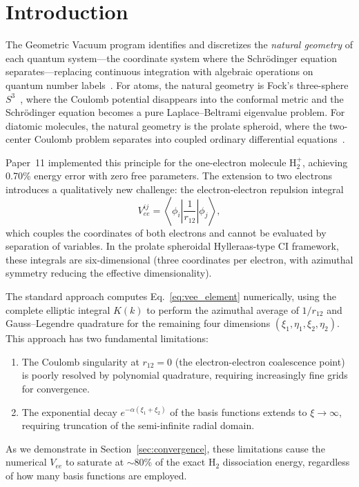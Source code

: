 \documentclass[aps,pra,twocolumn,superscriptaddress,longbibliography]{revtex4-2}
\begin{document}
\maketitle


\section{Introduction}
\label{sec:intro}

The Geometric Vacuum program identifies and discretizes the
\emph{natural geometry} of each quantum system---the coordinate
system where the Schr\"odinger equation separates---replacing
continuous integration with algebraic operations on quantum number
labels~\cite{loutey_paper0, loutey_paper1, loutey_paper7}.  For
atoms, the natural geometry is Fock's three-sphere
$S^3$~\cite{Fock1935}, where the Coulomb potential disappears into
the conformal metric and the Schr\"odinger equation becomes a pure
Laplace--Beltrami eigenvalue problem.  For diatomic molecules, the
natural geometry is the prolate spheroid, where the two-center
Coulomb problem separates into coupled ordinary differential
equations~\cite{loutey_paper11}.

Paper~11 implemented this principle for the one-electron
molecule H$_2^+$, achieving 0.70\% energy error with zero free
parameters.  The extension to two electrons introduces a
qualitatively new challenge: the electron-electron repulsion
integral
\begin{equation}
  V_{ee}^{ij} = \left\langle\phi_i\left|\frac{1}{r_{12}}\right|\phi_j\right\rangle,
  \label{eq:vee_element}
\end{equation}
which couples the coordinates of both electrons and cannot be
evaluated by separation of variables.  In the prolate spheroidal
Hylleraas-type CI framework, these integrals are six-dimensional
(three coordinates per electron, with azimuthal symmetry reducing
the effective dimensionality).

The standard approach computes Eq.~\eqref{eq:vee_element}
numerically, using the complete elliptic integral $K(k)$ to perform
the azimuthal average of $1/r_{12}$ and Gauss--Legendre quadrature
for the remaining four dimensions $(\xi_1, \eta_1, \xi_2, \eta_2)$.
This approach has two fundamental limitations:
\begin{enumerate}
  \item The Coulomb singularity at $r_{12} = 0$ (the
    electron-electron coalescence point) is poorly resolved by
    polynomial quadrature, requiring increasingly fine grids for
    convergence.
  \item The exponential decay $e^{-\alpha(\xi_1 + \xi_2)}$ of the
    basis functions extends to $\xi \to \infty$, requiring
    truncation of the semi-infinite radial domain.
\end{enumerate}
As we demonstrate in Section~\ref{sec:convergence}, these
limitations cause the numerical $V_{ee}$ to saturate at $\sim$80\%
of the exact H$_2$ dissociation energy, regardless of how many
basis functions are employed.
\end{document}
